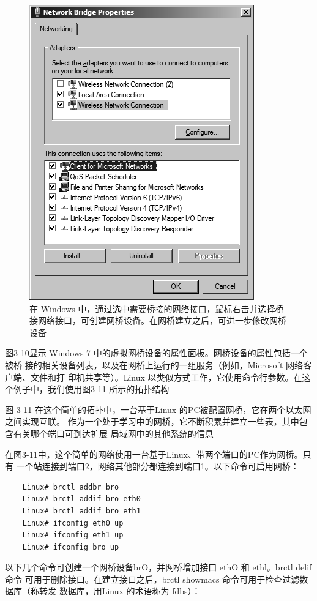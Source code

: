 \begin{figure}
    \centering
    \includegraphics[scale=0.5]{imgs/3/3-10.png}
    \caption{在 Windows 中，通过选中需要桥接的网络接口，鼠标右击并选择桥接网络接口，可创建网桥设备。在网桥建立之后，可进一步修改网桥设备}
\end{figure}

图3-10显示 Windows 7 中的虚拟网桥设备的属性面板。网桥设备的属性包括一个被桥
接的相关设备列表，以及在网桥上运行的一组服务（例如，Microsoft 网络客户端、文件和打
印机共享等）。Linux 以类似方式工作，它使用命令行参数。在这个例子中，我们使用图3-11
所示的拓扑结构

图 3-11
在这个简单的拓扑中，一台基于Linux 的PC被配置网桥，它在两个以太网之间实现互联。
作为一个处于学习中的网桥，它不断积累并建立一些表，其中包含有关哪个端口可到达扩展
局域网中的其他系统的信息

在图3-11中，这个简单的网络使用一台基于Linux、带两个端口的PC作为网桥。只有
一个站连接到端口2，网络其他部分都连接到端口1。以下命令可启用网桥：
\begin{verbatim}
    Linux# brctl addbr bro
    Linux# brctl addif bro eth0
    Linux# brctl addif bro eth1
    Linux# ifconfig eth0 up
    Linux# ifconfig eth1 up
    Linux# ifconfig bro up
\end{verbatim}

以下几个命令可创建一个网桥设备brO，并网桥增加接口 ethO 和 ethl。brctl delif 命令
可用于删除接口。在建立接口之后，brctl showmacs 命令可用于检查过滤数据库（称转发
数据库，用Linux 的术语称为 fdbs）：

